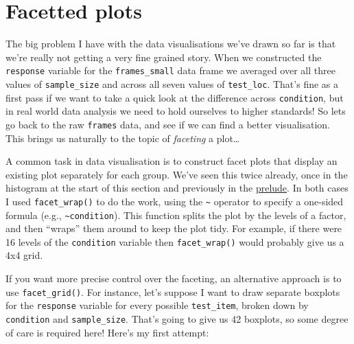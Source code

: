 \documentclass[]{book}
\newenvironment{Shaded}{\begin{snugshade}}{\end{snugshade}}
\newcommand{\CommentTok}[1]{\textcolor[rgb]{0.56,0.35,0.01}{\textit{#1}}}
\newcommand{\DataTypeTok}[1]{\textcolor[rgb]{0.13,0.29,0.53}{#1}}
\newcommand{\KeywordTok}[1]{\textcolor[rgb]{0.13,0.29,0.53}{\textbf{#1}}}
\newcommand{\NormalTok}[1]{#1}
\newcommand{\OperatorTok}[1]{\textcolor[rgb]{0.81,0.36,0.00}{\textbf{#1}}}
\newcommand{\StringTok}[1]{\textcolor[rgb]{0.31,0.60,0.02}{#1}}
\begin{document}
\hypertarget{facetted-plots}{%
\section{Facetted plots}\label{facetted-plots}}

The big problem I have with the data visualisations we've drawn so far is that we're really not getting a very fine grained story. When we constructed the \texttt{response} variable for the \texttt{frames\_small} data frame we averaged over all three values of \texttt{sample\_size} and across all seven values of \texttt{test\_loc}. That's fine as a first pass if we want to take a quick look at the difference across \texttt{condition}, but in real world data analysis we need to hold ourselves to higher standards! So lets go back to the raw \texttt{frames} data, and see if we can find a better visualisation. This brings us naturally to the topic of \emph{faceting} a plot\ldots{}

A common task in data visualisation is to construct facet plots that display an existing plot separately for each group. We've seen this twice already, once in the histogram at the start of this section and previously in the \href{./prelude-to-data.html}{prelude}. In both cases I used \texttt{facet\_wrap()} to do the work, using the \texttt{\textasciitilde{}} operator to specify a one-sided formula (e.g., \texttt{\textasciitilde{}condition}). This function splits the plot by the levels of a factor, and then ``wraps'' them around to keep the plot tidy. For example, if there were 16 levels of the \texttt{condition} variable then \texttt{facet\_wrap()} would probably give us a 4x4 grid.

If you want more precise control over the faceting, an alternative approach is to use \texttt{facet\_grid()}. For instance, let's suppose I want to draw separate boxplots for the \texttt{response} variable for every possible \texttt{test\_item}, broken down by \texttt{condition} and \texttt{sample\_size}. That's going to give us 42 boxplots, so some degree of care is required here! Here's my first attempt:

\begin{Shaded}
\end{Shaded}
\end{document}
